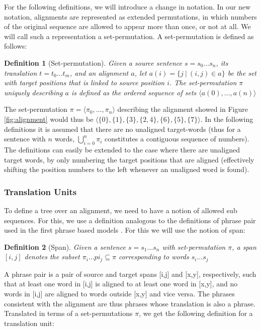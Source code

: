\documentclass{report}
\theoremstyle{definition}
\theoremstyle{plain}
\newtheorem{definition}{Definition}
\begin{document}
For the following definitions, we will introduce a change in notation. In our new notation, alignments are represented as extended permutations, in which numbers of the original sequence are allowed to appear more than once, or not at all. We will call such a representation a set-permutation. A set-permutation is defined as follows:

\begin{definition}[Set-permutation]
Given a source sentence $s = s_0 \ldots s_n$, its translation $t = t_0 \ldots t_m$, and an alignment $a$, let $a(i) = \{j~|~(i,j)\in a\}$ be the set with target positions that is linked to source position $i$. The set-permutation $\pi$ uniquely describing $a$ is defined as the ordered sequence of sets
$\langle a(0), \ldots, a(n) \rangle$
\end{definition}

The set-permutation $\pi = \langle\pi_0, ..., \pi_n\rangle$ describing the alignment showed in Figure \ref{fig:alignment} would thus be $\langle \{0\}, \{1\}, \{3\}, \{2,4\}, \{6\}, \{5\}, \{7\}\rangle$. In the following definitions it is assumed that there are no unaligned target-words (thus for a sentence with $n$ words, $\bigcup_{i=0}^n \pi_i$ constitutes a contiguous sequence of numbers). The definitions can easily be extended to the case where there are unaligned target words, by only numbering the target positions that are aligned (effectively shifting the position numbers to the left whenever an unaligned word is found).

\subsubsection{Translation Units} To define a tree over an alignment, we need to have a notion of allowed sub sequences. For this, we use a definition analogous to the definitions of phrase pair used in the first phrase based models \citep{och2004alignment}. For this we will use the notion of span:

\begin{definition}[Span]
Given a sentence $s = s_1\ldots s_n$ with set-permutation $\pi$, a span $[i,j]$ denotes the subset $\pi_i\ldots pi_j\subseteq \pi$ corresponding to words $s_i\ldots s_j$
\end{definition}

A phrase pair is a pair of source and target spans [i,j] and [x,y], respectively, such that at least one word in [i,j] is aligned to at least one word in [x,y], and no words in [i,j] are aligned to words outside [x,y] and vice versa. The phrases consistent with the alignment are thus phrases whose translation is also a phrase. Translated in terms of a set-permutations $\pi$, we get the following definition for a translation unit:
\end{document}
